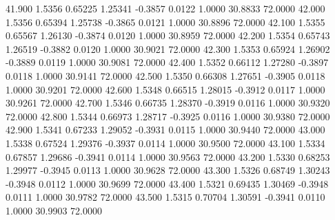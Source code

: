   41.900   1.5356   0.65225   1.25341  -0.3857   0.0122   1.0000  30.8833  72.0000
  42.000   1.5356   0.65394   1.25738  -0.3865   0.0121   1.0000  30.8896  72.0000
  42.100   1.5355   0.65567   1.26130  -0.3874   0.0120   1.0000  30.8959  72.0000
  42.200   1.5354   0.65743   1.26519  -0.3882   0.0120   1.0000  30.9021  72.0000
  42.300   1.5353   0.65924   1.26902  -0.3889   0.0119   1.0000  30.9081  72.0000
  42.400   1.5352   0.66112   1.27280  -0.3897   0.0118   1.0000  30.9141  72.0000
  42.500   1.5350   0.66308   1.27651  -0.3905   0.0118   1.0000  30.9201  72.0000
  42.600   1.5348   0.66515   1.28015  -0.3912   0.0117   1.0000  30.9261  72.0000
  42.700   1.5346   0.66735   1.28370  -0.3919   0.0116   1.0000  30.9320  72.0000
  42.800   1.5344   0.66973   1.28717  -0.3925   0.0116   1.0000  30.9380  72.0000
  42.900   1.5341   0.67233   1.29052  -0.3931   0.0115   1.0000  30.9440  72.0000
  43.000   1.5338   0.67524   1.29376  -0.3937   0.0114   1.0000  30.9500  72.0000
  43.100   1.5334   0.67857   1.29686  -0.3941   0.0114   1.0000  30.9563  72.0000
  43.200   1.5330   0.68253   1.29977  -0.3945   0.0113   1.0000  30.9628  72.0000
  43.300   1.5326   0.68749   1.30243  -0.3948   0.0112   1.0000  30.9699  72.0000
  43.400   1.5321   0.69435   1.30469  -0.3948   0.0111   1.0000  30.9782  72.0000
  43.500   1.5315   0.70704   1.30591  -0.3941   0.0110   1.0000  30.9903  72.0000
